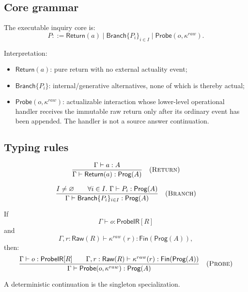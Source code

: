 \documentclass[11pt,oneside]{article}
\newcommand{\Prog}{\mathsf{Prog}}
\newcommand{\Raw}{\mathsf{Raw}}
\newcommand{\ProbeIR}{\mathsf{ProbeIR}}
\begin{document}
\subsection{Core grammar}

The executable inquiry core is:
\[
\boxed{
P::=
\mathsf{Return}(a)
\mid
\mathsf{Branch}\{P_i\}_{i\in I}
\mid
\mathsf{Probe}(o,\kappa^{raw}).
}
\]

Interpretation:
\begin{itemize}
\item \(\mathsf{Return}(a)\): pure return with no external actuality event;
\item \(\mathsf{Branch}\{P_i\}\): internal/generative alternatives, none of which is thereby actual;
\item \(\mathsf{Probe}(o,\kappa^{raw})\): actualizable interaction whose lower-level operational
      handler receives the immutable raw return only after its ordinary event has been appended.
      The handler is not a source answer continuation.
\end{itemize}

\subsection{Typing rules}

\[
\frac{\Gamma\vdash a:A}
{\Gamma\vdash\mathsf{Return}(a):\Prog(A)}
\quad(\textsc{Return})
\]

\[
\frac{
I\neq\varnothing
\qquad
\forall i\in I.\ \Gamma\vdash P_i:\Prog(A)
}{
\Gamma\vdash\mathsf{Branch}\{P_i\}_{i\in I}:\Prog(A)
}
\quad(\textsc{Branch})
\]

If
\[
\Gamma\vdash o:\ProbeIR[R]
\]
and
\[
\Gamma,r:\Raw(R)\vdash\kappa^{raw}(r):\mathsf{Fin}(\Prog(A)),
\]
then:
\[
\frac{
\Gamma\vdash o:\ProbeIR[R]
\qquad
\Gamma,r:\Raw(R)\vdash\kappa^{raw}(r):\mathsf{Fin}(\Prog(A))
}{
\Gamma\vdash\mathsf{Probe}(o,\kappa^{raw}):\Prog(A)
}
\quad(\textsc{Probe})
\]

A deterministic continuation is the singleton specialization.
\end{document}
